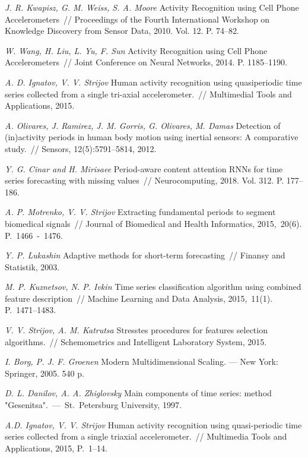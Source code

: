 \documentclass[12pt, twoside]{article}
\numberwithin{equation}{section}
\begin{document}
\begin{thebibliography}{99}
	\textit{J. R. Kwapisz, G. M. Weiss, S. A. Moore} Activity Recognition using Cell Phone Accelerometers~// Proceedings of the Fourth International Workshop on Knowledge Discovery from Sensor Data, 2010. Vol. 12. P. 74--82.
	
	\textit{W. Wang, H. Liu, L. Yu, F. Sun} Activity Recognition using Cell Phone Accelerometers~// Joint Conference on Neural Networks, 2014. P. 1185--1190.
	
	\textit{A. D. Ignatov, V. V. Strijov} Human activity recognition using quasiperiodic time series collected from a single tri-axial accelerometer.~// Multimedial Tools and Applications, 2015.
	
	\textit{A. Olivares, J. Ramirez, J. M. Gorris, G. Olivares, M. Damas} Detection of (in)activity periods in human body motion using inertial sensors: A comparative study.~// Sensors, 12(5):5791–5814, 2012.
	
	\textit{Y. G. Cinar and H. Mirisaee} Period-aware content attention RNNs for time series forecasting with missing values~// Neurocomputing, 2018. Vol. 312. P. 177--186.
	
	\textit{A. P. Motrenko, V. V. Strijov} Extracting fundamental periods to segment biomedical signals~// Journal of Biomedical and Health Informatics, 2015,~20(6). P.~1466~-~1476.
	
	\textit{Y. P. Lukashin} Adaptive methods for short-term forecasting~// Finansy and Statistik, 2003.
	
	\textit{M. P. Kuznetsov,  N. P. Ivkin} Time series classification algorithm using combined feature description~// Machine Learning and Data Analysis, 2015,~11(1). P.~1471--1483.
	
	\textit{V. V. Strijov, A. M. Katrutsa} Stresstes procedures for features selection algorithms.~// Schemometrics and Intelligent Laboratory System, 2015.
	
	\textit{I. Borg, P. J. F. Groenen} Modern Multidimensional Scaling. --- New York: Springer, 2005. 540 p.
	
	\textit{D. L. Danilov, A. A. Zhiglovsky} Main components of time series: method "Gesenitsa".~---~St.~Petersburg University, 1997.
	
	\textit{A.D. Ignatov, V. V. Strijov} Human activity recognition using quasi-periodic time series collected from a single triaxial accelerometer.~// Multimedia Tools and Applications, 2015, P.~1--14.

	
\end{thebibliography}
\end{document}
